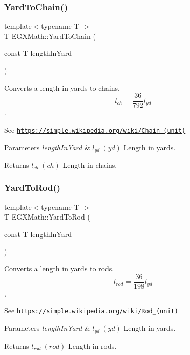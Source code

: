 \subsubsection{\texorpdfstring{Yard\+To\+Chain()}{YardToChain()}}
{\footnotesize\ttfamily template$<$typename T $>$ \\
T E\+G\+X\+Math\+::\+Yard\+To\+Chain (\begin{DoxyParamCaption}\item[{const T}]{length\+In\+Yard }\end{DoxyParamCaption})}



Converts a length in yards to chains. \[ l_{ch}= \frac{36}{792} l_{yd} \]. 

See \href{https://simple.wikipedia.org/wiki/Chain_(unit)}{\tt https\+://simple.\+wikipedia.\+org/wiki/\+Chain\+\_\+(unit)} 
\begin{DoxyParams}{Parameters}
{\em length\+In\+Yard} & $ l_{yd}\ (yd)$ Length in yards. \\
\hline
\end{DoxyParams}
\begin{DoxyReturn}{Returns}
$ l_{ch}\ (ch)$ Length in chains. 
\end{DoxyReturn}
\mbox{\label{group___e_g_x_math-_conversions-_length_conversions-_imperial-_yard-_surveyors_ga5c59ea68e354d48288451d711d68824f}} 
\subsubsection{\texorpdfstring{Yard\+To\+Rod()}{YardToRod()}}
{\footnotesize\ttfamily template$<$typename T $>$ \\
T E\+G\+X\+Math\+::\+Yard\+To\+Rod (\begin{DoxyParamCaption}\item[{const T}]{length\+In\+Yard }\end{DoxyParamCaption})}



Converts a length in yards to rods. \[ l_{rod}= \frac{36}{198} l_{yd} \]. 

See \href{https://simple.wikipedia.org/wiki/Rod_(unit)}{\tt https\+://simple.\+wikipedia.\+org/wiki/\+Rod\+\_\+(unit)} 
\begin{DoxyParams}{Parameters}
{\em length\+In\+Yard} & $ l_{yd}\ (yd)$ Length in yards. \\
\hline
\end{DoxyParams}
\begin{DoxyReturn}{Returns}
$ l_{rod}\ (rod)$ Length in rods. 
\end{DoxyReturn}
